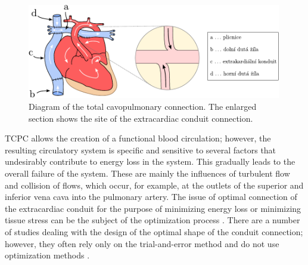 \begin{figure}[h]
	\centering
	\includegraphics[width=0.99\textwidth]{figures/srdce-zoom.pdf}
	\vspace{5mm}
	\caption{Diagram of the total cavopulmonary connection. The enlarged section shows the site of the extracardiac conduit connection.}
	\label{fig:tcpc}

\end{figure}

TCPC allows the creation of a functional blood circulation; however, the resulting circulatory system is specific and sensitive to several factors that undesirably contribute to energy loss in the system. This gradually leads to the overall failure of the system. These are mainly the influences of turbulent flow and collision of flows, which occur, for example, at the outlets of the superior and inferior vena cava into the pulmonary artery. The issue of optimal connection of the extracardiac conduit for the purpose of minimizing energy loss or minimizing tissue stress can be the subject of the optimization process \cite{Chaloup, vanBake, Wang}. There are a number of studies dealing with the design of the optimal shape of the conduit connection; however, they often rely only on the trial-and-error method and do not use optimization methods \cite{Rijnberg2018, Porfiryev2020, Tang2014}.

